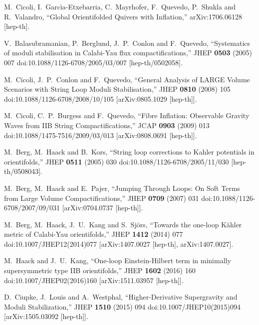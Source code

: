 \documentclass[11pt,a4paper]{article}
\begin{document}
\begin{thebibliography}{99}
  M.~Cicoli, I.~Garcìa-Etxebarria, C.~Mayrhofer, F.~Quevedo, P.~Shukla and R.~Valandro,
  ``Global Orientifolded Quivers with Inflation,''
  arXiv:1706.06128 [hep-th].

  V.~Balasubramanian, P.~Berglund, J.~P.~Conlon and F.~Quevedo,
  ``Systematics of moduli stabilisation in Calabi-Yau flux compactifications,''
  JHEP {\bf 0503} (2005) 007
  doi:10.1088/1126-6708/2005/03/007
  [hep-th/0502058].
	
  M.~Cicoli, J.~P.~Conlon and F.~Quevedo,
  ``General Analysis of LARGE Volume Scenarios with String Loop Moduli Stabilisation,''
  JHEP {\bf 0810} (2008) 105
  doi:10.1088/1126-6708/2008/10/105
  [arXiv:0805.1029 [hep-th]].

  M.~Cicoli, C.~P.~Burgess and F.~Quevedo,
  ``Fibre Inflation: Observable Gravity Waves from IIB String Compactifications,''
  JCAP {\bf 0903} (2009) 013
  doi:10.1088/1475-7516/2009/03/013
  [arXiv:0808.0691 [hep-th]].
  
  M.~Berg, M.~Haack and B.~Kors,
  ``String loop corrections to Kahler potentials in orientifolds,''
  JHEP {\bf 0511} (2005) 030
  doi:10.1088/1126-6708/2005/11/030
  [hep-th/0508043].	
	
  M.~Berg, M.~Haack and E.~Pajer,
  ``Jumping Through Loops: On Soft Terms from Large Volume Compactifications,''
  JHEP {\bf 0709} (2007) 031
  doi:10.1088/1126-6708/2007/09/031
  [arXiv:0704.0737 [hep-th]].

  M.~Berg, M.~Haack, J.~U.~Kang and S.~Sjörs,
  ``Towards the one-loop Kähler metric of Calabi-Yau orientifolds,''
  JHEP {\bf 1412} (2014) 077
  doi:10.1007/JHEP12(2014)077
  [arXiv:1407.0027 [hep-th], arXiv:1407.0027].

  M.~Haack and J.~U.~Kang,
  ``One-loop Einstein-Hilbert term in minimally supersymmetric type IIB orientifolds,''
  JHEP {\bf 1602} (2016) 160
  doi:10.1007/JHEP02(2016)160
  [arXiv:1511.03957 [hep-th]].

  D.~Ciupke, J.~Louis and A.~Westphal,
  ``Higher-Derivative Supergravity and Moduli Stabilization,''
  JHEP {\bf 1510} (2015) 094
  doi:10.1007/JHEP10(2015)094
  [arXiv:1505.03092 [hep-th]].
  

\end{thebibliography}
\end{document}
